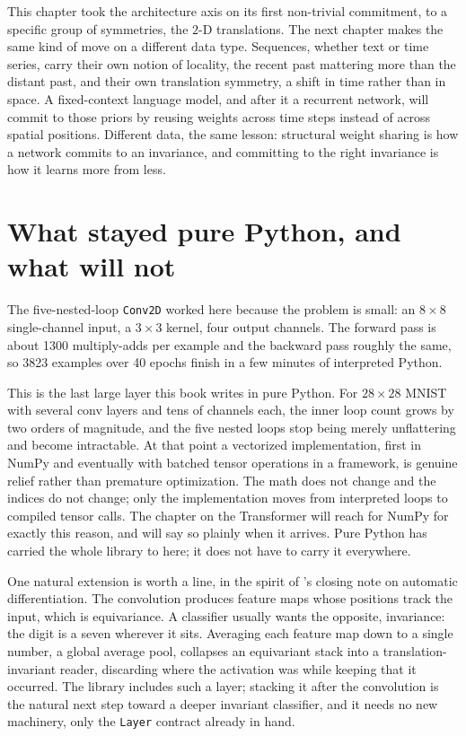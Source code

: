This chapter took the architecture axis on its first non-trivial commitment,
to a specific group of symmetries, the $2$-D translations. The next chapter
makes the same kind of move on a different data type. Sequences, whether text
or time series, carry their own notion of locality, the recent past mattering
more than the distant past, and their own translation symmetry, a shift in
time rather than in space. A fixed-context language model, and after it a
recurrent network, will commit to those priors by reusing weights across time
steps instead of across spatial positions. Different data, the same lesson:
structural weight sharing is how a network commits to an invariance, and
committing to the right invariance is how it learns more from less.

\section{What stayed pure Python, and what will not}\label{sec:pure-python-boundary}

The five-nested-loop \texttt{Conv2D} worked here because the problem is small:
an $8 \times 8$ single-channel input, a $3 \times 3$ kernel, four output
channels. The forward pass is about 1300 multiply-adds per example and the
backward pass roughly the same, so 3823 examples over 40 epochs finish in a
few minutes of interpreted Python.

This is the last large layer this book writes in pure Python. For $28 \times
28$ MNIST with several conv layers and tens of channels each, the inner loop
count grows by two orders of magnitude, and the five nested loops stop being
merely unflattering and become intractable. At that point a vectorized
implementation, first in NumPy and eventually with batched tensor operations
in a framework, is genuine relief rather than premature optimization. The math
does not change and the indices do not change; only the implementation moves
from interpreted loops to compiled tensor calls. The chapter on the Transformer
will reach for NumPy for exactly this reason, and will say so plainly when it
arrives. Pure Python has carried the whole library to here; it does not have to
carry it everywhere.

One natural extension is worth a line, in the spirit of 's
closing note on automatic differentiation. The convolution produces feature
maps whose positions track the input, which is equivariance. A classifier
usually wants the opposite, invariance: the digit is a seven wherever it sits.
Averaging each feature map down to a single number, a global average pool,
collapses an equivariant stack into a translation-invariant reader, discarding
where the activation was while keeping that it occurred. The library includes
such a layer; stacking it after the convolution is the natural next step toward
a deeper invariant classifier, and it needs no new machinery, only the
\texttt{Layer} contract already in hand.

